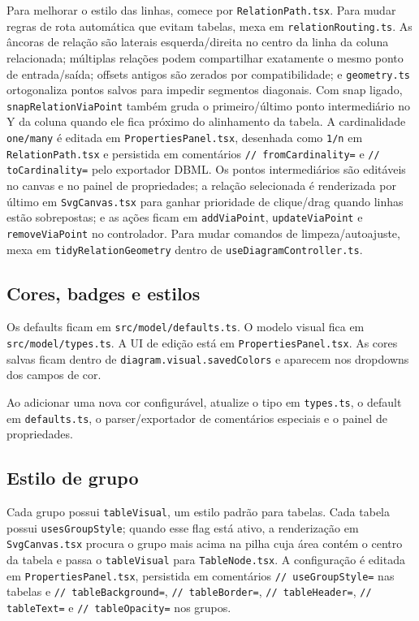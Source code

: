 \documentclass[11pt,a4paper]{article}
\begin{document}
Para melhorar o estilo das linhas, comece por \texttt{RelationPath.tsx}. Para mudar regras de rota automática que evitam tabelas, mexa em \texttt{relationRouting.ts}. As âncoras de relação são laterais esquerda/direita no centro da linha da coluna relacionada; múltiplas relações podem compartilhar exatamente o mesmo ponto de entrada/saída; offsets antigos são zerados por compatibilidade; e \texttt{geometry.ts} ortogonaliza pontos salvos para impedir segmentos diagonais. Com snap ligado, \texttt{snapRelationViaPoint} também gruda o primeiro/último ponto intermediário no Y da coluna quando ele fica próximo do alinhamento da tabela. A cardinalidade \texttt{one/many} é editada em \texttt{PropertiesPanel.tsx}, desenhada como \texttt{1/n} em \texttt{RelationPath.tsx} e persistida em comentários \texttt{// fromCardinality=} e \texttt{// toCardinality=} pelo exportador DBML. Os pontos intermediários são editáveis no canvas e no painel de propriedades; a relação selecionada é renderizada por último em \texttt{SvgCanvas.tsx} para ganhar prioridade de clique/drag quando linhas estão sobrepostas; e as ações ficam em \texttt{addViaPoint}, \texttt{updateViaPoint} e \texttt{removeViaPoint} no controlador. Para mudar comandos de limpeza/autoajuste, mexa em \texttt{tidyRelationGeometry} dentro de \texttt{useDiagramController.ts}.

\subsection{Cores, badges e estilos}

Os defaults ficam em \texttt{src/model/defaults.ts}. O modelo visual fica em \texttt{src/model/types.ts}. A UI de edição está em \texttt{PropertiesPanel.tsx}. As cores salvas ficam dentro de \texttt{diagram.visual.savedColors} e aparecem nos dropdowns dos campos de cor.

Ao adicionar uma nova cor configurável, atualize o tipo em \texttt{types.ts}, o default em \texttt{defaults.ts}, o parser/exportador de comentários especiais e o painel de propriedades.

\subsection{Estilo de grupo}

Cada grupo possui \texttt{tableVisual}, um estilo padrão para tabelas. Cada tabela possui \texttt{usesGroupStyle}; quando esse flag está ativo, a renderização em \texttt{SvgCanvas.tsx} procura o grupo mais acima na pilha cuja área contém o centro da tabela e passa o \texttt{tableVisual} para \texttt{TableNode.tsx}. A configuração é editada em \texttt{PropertiesPanel.tsx}, persistida em comentários \texttt{// useGroupStyle=} nas tabelas e \texttt{// tableBackground=}, \texttt{// tableBorder=}, \texttt{// tableHeader=}, \texttt{// tableText=} e \texttt{// tableOpacity=} nos grupos.
\end{document}

